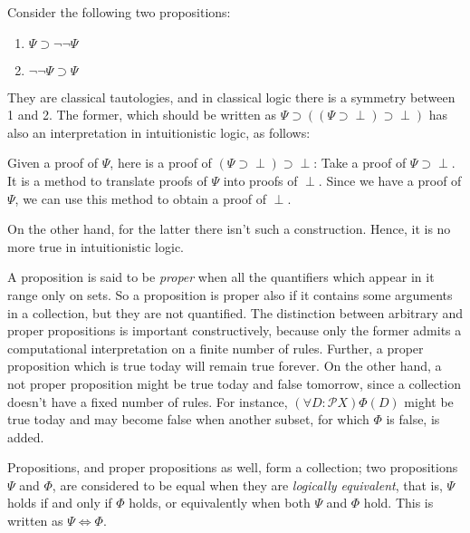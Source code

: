\begin{example}
  Consider the following two propositions:
  \begin{enumerate}
  \item $\Psi\supset\neg\neg\Psi$
  \item $\neg\neg\Psi\supset\Psi$
  \end{enumerate}
  They are classical tautologies, and in classical logic there is a symmetry
  between 1 and 2. The former, which should be written as
  $\Psi\supset((\Psi\supset\perp)\supset\perp)$ has also an interpretation in
  intuitionistic logic, as follows:
  \begin{center}
    Given a proof of $\Psi$, here is a proof of
    $(\Psi\supset\perp)\supset\perp$: Take a proof of $\Psi\supset\perp$. It is
    a method to translate proofs of $\Psi$ into proofs of $\perp$. Since we have
    a proof of $\Psi$, we can use this method to obtain a proof of $\perp$.
  \end{center}
  On the other hand, for the latter there isn't such a construction. Hence, it
  is no more true in intuitionistic logic.
\end{example}

A proposition is said to be \textit{proper} when all the quantifiers which
appear in it range only on sets. So a proposition is proper also if it contains
some arguments in a collection, but they are not quantified. The distinction
between arbitrary and proper propositions is important constructively, because
only the former admits a computational interpretation on a finite number of
rules. Further, a proper proposition which is true today will remain true
forever. On the other hand, a not proper proposition might be true today and
false tomorrow, since a collection doesn't have a fixed number of rules. For
instance, $(\forall D : \mathcal{P}X)\Phi(D)$ might be true today and may become
false when another subset, for which $\Phi$ is false, is added.

Propositions, and proper propositions as well, form a collection; two
propositions $\Psi$ and $\Phi$, are considered to be equal when they are
\textit{logically equivalent}, that is, $\Psi$ holds if and only if $\Phi$
holds, or equivalently when both $\Psi$ and $\Phi$ hold. This is written as
$\Psi \iff \Phi$.

